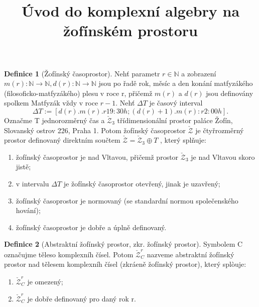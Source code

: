 \documentclass[12pt,a4paper]{article}
\title{\textbf{Úvod do komplexní algebry na žofínském prostoru}}
\date{}
\begin{document}
\maketitle


\textbf{Definice 1}
(Žofínský časoprostor).
Nehť parametr $r \in \mathds{N}$ a zobrazení
$m(r) : \mathds{N} \rightarrow \mathds{N},d(r) : \mathds{N} \rightarrow \mathds{N}$
jsou po řadě rok, měsíc a den konání matfyzákého (filosoficko-matfyzákého)
plesu v roce r, přičemž $m(r)$ a $d(r)$ jsou definovány spolkem Matfyzák vždy v roce $r - 1$.
Nehť $\Delta T$ je časový interval
$$
\Delta T := [d(r). m(r). r 19:30 h; (d(r) + 1). m(r): r 2:00 h].
$$
Označme T jednorozměrný čas a $\check{\mathcal{Z}}_3$ třídimensionální prostor paláce Žofín,
Slovanský ostrov 226, Praha 1. Potom žofínský časoprostor $\check{\mathcal{Z}}$ je čtyřrozměrný prostor definovaný
direktním součtem $\check{\mathcal{Z}} = \check{\mathcal{Z}}_3 \oplus T$ , který splňuje:\\
\begin{enumerate}
\item žofínský časoprostor je nad Vltavou, přičemž prostor $\check{\mathcal{Z}}_3$ je nad Vltavou skoro jistě;
\item v intervalu $\Delta T$ je žofínský časoprostor otevřený, jinak je uzavřený;
\item žofínský časoprostor je normovaný (se standardní normou společenského hování);
\item žofínský časoprostor je dobře a úplně definovaný.
\end{enumerate}


\textbf{Definice 2}
(Abstraktní žofínský prostor, zkr. žofínský prostor).
Symbolem C označujme těleso komplexníh čísel. Potom $\check{\mathcal{Z}}_{C}^r$ nazveme
abstraktní žofínský prostor nad tělesem komplexníh čísel
(zkráeně žofínský prostor), který splòuje:
\begin{enumerate}
\itemsep0em 
\item $\check{\mathcal{Z}}_C^r$ je omezený;
\item $\check{\mathcal{Z}}_C^r$ je dobře definovaný pro daný rok r.
\end{enumerate}
\end{document}
